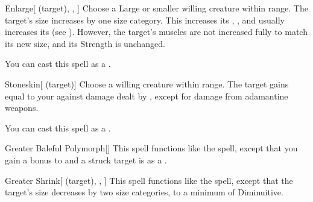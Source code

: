 \lowercase{\hypertarget{spell:Enlarge}{}}\label{spell:Enlarge}
\begin{attuneability}[\nth{3}]{\hypertarget{spell:Enlarge}{Enlarge}}[ (target), , ]
Choose a Large or smaller willing creature within \rngclose range.
The target's size increases by one size category.
This increases its , , and usually increases its  (see ).
However, the target's muscles are not increased fully to match its new size, and its Strength is unchanged.

You can cast this spell as a .
\end{attuneability}
\vspace{0.25em}



\lowercase{\hypertarget{spell:Stoneskin}{}}\label{spell:Stoneskin}
\begin{attuneability}[\nth{3}]{\hypertarget{spell:Stoneskin}{Stoneskin}}[ (target)]
Choose a willing creature within \rngclose range.
The target gains  equal to your  against damage dealt by , except for damage from adamantine weapons.

You can cast this spell as a .
\end{attuneability}
\vspace{0.25em}



\lowercase{\hypertarget{spell:Greater Baleful Polymorph}{}}\label{spell:Greater Baleful Polymorph}
\begin{apability}[\nth{4}]{\hypertarget{spell:Greater Baleful Polymorph}{Greater Baleful Polymorph}}[]
This spell functions like the  spell, except that you gain a  bonus to  and a struck target is  as a .
\end{apability}
\vspace{0.25em}



\lowercase{\hypertarget{spell:Greater Shrink}{}}\label{spell:Greater Shrink}
\begin{attuneability}[\nth{4}]{\hypertarget{spell:Greater Shrink}{Greater Shrink}}[ (target), , ]
This spell functions like the  spell, except that the target's size decreases by two size categories, to a minimum of Diminuitive.
\end{attuneability}
\vspace{0.25em}



